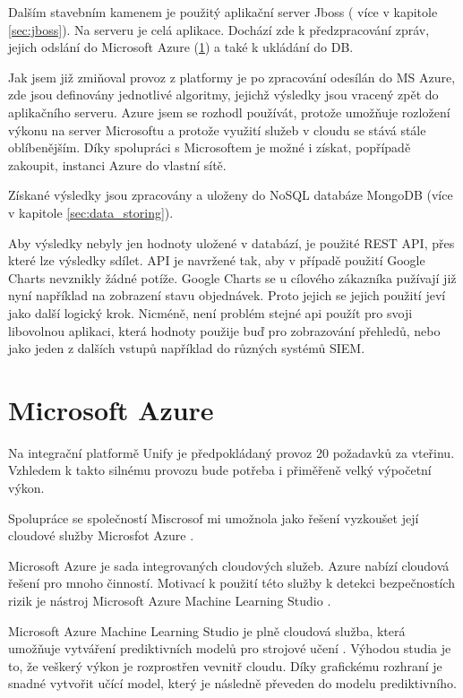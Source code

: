 \documentclass[thesis=M,czech]{FITthesis}[2012/10/20]
\begin{document}
	Dalším stavebním kamenem je použitý aplikační server Jboss ( více v kapitole \ref{sec:jboss}). Na serveru je celá aplikace. Dochází zde k předzpracování zpráv, jejich odslání do Microsoft Azure (\ref{sec:ms_azure}) a také k ukládání do DB.
	
	Jak jsem již zmiňoval provoz z platformy je po zpracování odesílán do MS Azure, zde jsou definovány jednotlivé algoritmy, jejichž výsledky jsou vracený zpět do aplikačního serveru. Azure jsem se rozhodl používát, protože umožňuje rozložení výkonu na server Microsoftu a protože využití služeb v cloudu se stává stále oblíbenějším. Díky spolupráci s Microsoftem je možné i získat, popřípadě zakoupit, instanci Azure do vlastní sítě.
	
	Získané výsledky jsou zpracovány a uloženy do NoSQL databáze MongoDB (více v kapitole \ref{sec:data_storing}).
	
	Aby výsledky nebyly jen hodnoty uložené v databází, je použité REST API, přes které lze výsledky sdílet. API je navržené tak, aby v případě použití Google Charts nevznikly žádné potíže. Google Charts se u cílového zákazníka pužívají již nyní například na zobrazení stavu objednávek. Proto jejich se jejich použití jeví jako další logický krok. Nicméně, není problém stejné api použít pro svoji libovolnou aplikaci, která hodnoty použije buď pro zobrazování přehledů, nebo jako jeden z dalších vstupů například do různých systémů SIEM.
	
	\section{Microsoft Azure}
		\label{sec:ms_azure}
		Na integrační platformě Unify \cite{unify} je předpokládaný provoz 20 požadavků za vteřinu. Vzhledem k takto silnému provozu bude potřeba i přiměřeně velký výpočetní výkon. 
			
		Spolupráce se společností Miscrosof \cite{microsoft} mi umožnola jako řešení vyzkoušet její cloudové služby Microsfot Azure \cite{msAzure}.
			
		Microsoft Azure je sada integrovaných cloudových služeb. Azure nabízí cloudová řešení pro mnoho činností. Motivací k použití této služby k detekci bezpečnostích rizik je nástroj Microsoft Azure Machine Learning Studio \cite{msAzureStudio}.
			
		Microsoft Azure Machine Learning Studio je plně cloudová služba, která umožňuje vytváření prediktivních modelů pro strojové učení \cite{msAzureStudio}. Výhodou studia je to, že veškerý výkon je rozprostřen vevnitř cloudu. Díky grafickému rozhraní je snadné vytvořit učící model, který je následně převeden do modelu prediktivního.
			
\end{document}
